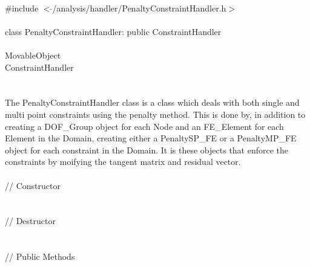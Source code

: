 
   \\
\indent \#include $<\tilde{
}$/analysis/handler/PenaltyConstraintHandler.h$>$  \\ 

  \\
\indent class PenaltyConstraintHandler: public ConstraintHandler  \\

 \\
\indent MovableObject \\
\indent\indent ConstraintHandler \\
\indent\indent{} \\

 \\ 
\indent The PenaltyConstraintHandler class is a class which deals with
both single and multi point constraints using the penalty method. 
This is done by, in addition to creating a DOF\_Group object
for each Node and an FE\_Element for each Element in the Domain,
creating either a PenaltySP\_FE or a PenaltyMP\_FE object for each
constraint in the Domain. It is these objects that enforce the
constraints by moifying the tangent matrix and residual vector. \\ 


 \\
\indent // Constructor \\
\\  \\ 
\indent // Destructor \\
\\  \\
\indent // Public Methods\\
 \\ 
 \\ \\
 \\
 \\


